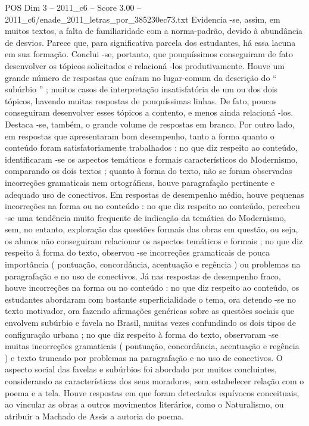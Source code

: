 \begin{textsample}{POS Dim 3 – 2011\_c6 – Score 3.00 – 2011\_c6/enade\_2011\_letras\_por\_385230ec73.txt}
Evidencia -se, assim, em muitos textos, a falta de familiaridade com a norma-padrão, devido à abundância de desvios.
Parece que, para significativa parcela dos estudantes, há essa lacuna em sua formação.
Conclui -se, portanto, que pouquíssimos conseguiram de fato desenvolver os tópicos solicitados e relacioná -los produtivamente.
Houve um grande número de respostas que caíram no lugar-comum da descrição do “ subúrbio ” ; muitos casos de interpretação insatisfatória de um ou dos dois tópicos, havendo muitas respostas de pouquíssimas linhas.
De fato, poucos conseguiram desenvolver esses tópicos a contento, e menos ainda relacioná -los.
Destaca -se, também, o grande volume de respostas em branco.
Por outro lado, em respostas que apresentaram bom desempenho, tanto a forma quanto o conteúdo foram satisfatoriamente trabalhados : no que diz respeito ao conteúdo, identificaram -se os aspectos temáticos e formais característicos do Modernismo, comparando os dois textos ; quanto à forma do texto, não se foram observadas incorreções gramaticais nem ortográficas, houve paragrafação pertinente e adequado uso de conectivos.
Em respostas de desempenho médio, houve pequenas incorreções na forma ou no conteúdo : no que diz respeito ao conteúdo, percebeu -se uma tendência muito frequente de indicação da temática do Modernismo, sem, no entanto, exploração das questões formais das obras em questão, ou seja, os alunos não conseguiram relacionar os aspectos temáticos e formais ; no que diz respeito à forma do texto, observou -se incorreções gramaticais de pouca importância ( pontuação, concordância, acentuação e regência ) ou problemas na paragrafação e no uso de conectivos.
Já nas respostas de desempenho fraco, houve incorreções na forma ou no conteúdo : no que diz respeito ao conteúdo, os estudantes abordaram com bastante superficialidade o tema, ora detendo -se no texto motivador, ora fazendo afirmações genéricas sobre as questões sociais que envolvem subúrbio e favela no Brasil, muitas vezes confundindo os dois tipos de configuração urbana ; no que diz respeito à forma do texto, observaram -se muitas incorreções gramaticais ( pontuação, concordância, acentuação e regência ) e texto truncado por problemas na paragrafação e no uso de conectivos.
O aspecto social das favelas e subúrbios foi abordado por muitos concluintes, considerando as características dos seus moradores, sem estabelecer relação com o poema e a tela.
Houve respostas em que foram detectados equívocos conceituais, ao vincular as obras a outros movimentos literários, como o Naturalismo, ou atribuir a Machado de Assis a autoria do poema.

\end{textsample}
